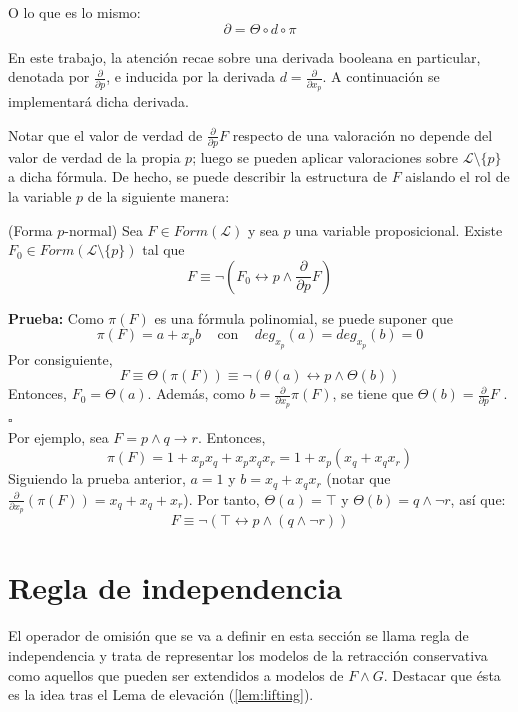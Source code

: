  \noindent O lo que es lo mismo: $$\partial = \Theta \circ d \circ \pi $$
 
 En este trabajo, la atención recae sobre una derivada booleana en particular, denotada por $\frac{\partial}{\partial p}$, e inducida por la derivada $d = \frac{\partial}{\partial x_p}$. A continuación se implementará dicha derivada.\\

 
Notar que el valor de verdad de $\frac{\partial}{\partial p}F$ respecto de una valoración no depende del valor de verdad de la propia $p$; luego se pueden aplicar valoraciones sobre $\mathcal{L} \setminus \{ p \}$ a dicha fórmula. De hecho, se puede describir la estructura de $F$ aislando el rol de la variable $p$ de la siguiente manera:

\lem \cite{Borrego2009} (Forma $p$-normal) Sea $F \in Form(\mathcal{L})$ y sea $p$ una variable proposicional. Existe $F_0 \in Form (\mathcal{L} \setminus \{ p \})$ tal que 
$$F \equiv \neg (F_0 \leftrightarrow p \wedge \frac{\partial}{\partial p} F)$$

\noindent \textbf{Prueba:} Como $\pi (F)$ es una fórmula polinomial, se puede suponer que
$$\pi (F) = a + x_p b \;\;\; \text{ con } \;\;\; deg_{x_p} (a) = deg_{x_p} (b) = 0$$
\noindent Por consiguiente,
$$F \equiv \Theta (\pi (F)) \equiv \neg (\theta (a) \leftrightarrow p \wedge \Theta (b)) $$
Entonces, $F_0 = \Theta (a)$. Además, como $b=\frac{\partial}{\partial x_p} \pi (F)$, se tiene que $\Theta (b) = \frac{\partial}{\partial p} F$ . \hspace{1cm} $\square$ \\

Por ejemplo, sea $F=p \wedge q \rightarrow r$. Entonces,
$$\pi (F) = 1+x_px_q + x_px_qx_r = 1+x_p (x_q+x_qx_r)$$
Siguiendo la prueba anterior, $a=1$ y $b=x_q+x_qx_r$ (notar que $\frac{\partial}{\partial x_p} (\pi (F))=x_q+x_q+x_r$). Por tanto, $\Theta (a) = \top$ y $\Theta (b)=q \wedge \neg r$, así que:
$$F \equiv \neg (\top \leftrightarrow p \wedge (q \wedge \neg r))$$


\section{Regla de independencia}
El operador de omisión que se va a definir en esta sección se llama regla de independencia y trata de representar los modelos de la retracción conservativa como aquellos que pueden ser extendidos a modelos de $F \wedge G$. Destacar que ésta es la idea tras el Lema de elevación (\ref{lem:lifting}).\\

